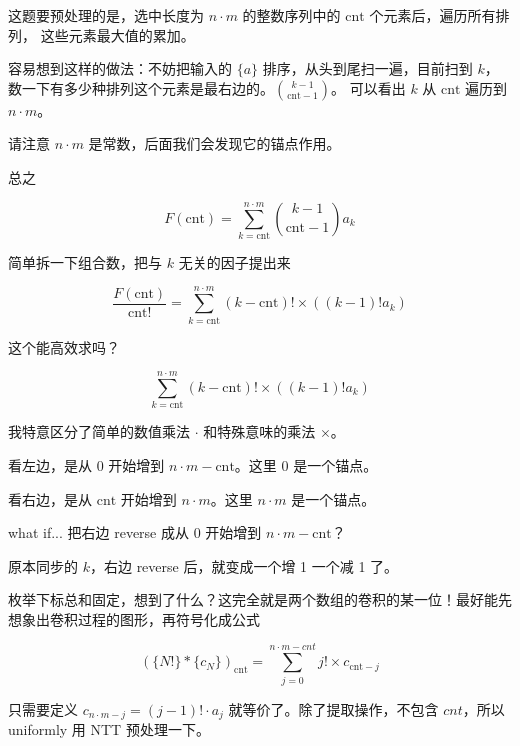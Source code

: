 \begin{frame}
  \newcommand{\cnt}{\text{cnt}}

  这题要预处理的是，选中长度为 $n\cdot m$ 的整数序列中的 $\cnt$ 个元素后，遍历所有排列，
  这些元素最大值的累加。
  
  容易想到这样的做法：不妨把输入的 $\{a\}$ 排序，从头到尾扫一遍，目前扫到 $k$，
  数一下有多少种排列这个元素是最右边的。$\binom{k-1}{\cnt-1}$。
  可以看出 $k$ 从 $\cnt$ 遍历到 $n\cdot m$。

  请注意 $n\cdot m$ 是常数，后面我们会发现它的锚点作用。
  
  总之

  $$
  F(\cnt) = \sum_{k = \cnt }^{n\cdot m} \binom{k-1}{\cnt - 1} a_{k}
  $$

  简单拆一下组合数，把与 $k$ 无关的因子提出来

  $$
  \frac{F(\cnt)}{\cnt!} = \sum_{k = \cnt }^{n\cdot m} (k-\cnt)! \times \left( (k-1)!a_{k} \right)
  $$  

  这个能高效求吗？

\end{frame}

\begin{frame}
  \newcommand{\cnt}{\text{cnt}}

  $$
  \sum_{k = \cnt }^{n\cdot m} (k-\cnt)! \times \left( (k-1)!a_{k} \right)
  $$

  我特意区分了简单的数值乘法 $\cdot$ 和特殊意味的乘法 $\times$。

  看左边，是从 $0$ 开始增到 $n\cdot m - \cnt$。这里 $0$ 是一个锚点。

  看右边，是从 $\cnt$ 开始增到 $n\cdot m$。这里 $n\cdot m$ 是一个锚点。

  what if... 把右边 reverse 成从 $0$ 开始增到 $n\cdot m - \cnt$？

  原本同步的 $k$，右边 reverse 后，就变成一个增 1 一个减 1 了。

  枚举下标总和固定，想到了什么？这完全就是两个数组的卷积的某一位！最好能先想象出卷积过程的图形，再符号化成公式

  $$
  ( \{ N! \}* \{ c_{N} \} )_{\cnt} = \sum\limits_{j=0}^{n\cdot m -cnt} j! \times c_{\cnt-j}
  $$

  只需要定义 $c_{n\cdot m - j} = (j-1)! \cdot a_j  $ 就等价了。除了提取操作，不包含 $cnt$，所以 uniformly 用 NTT 预处理一下。
  

\end{frame}

